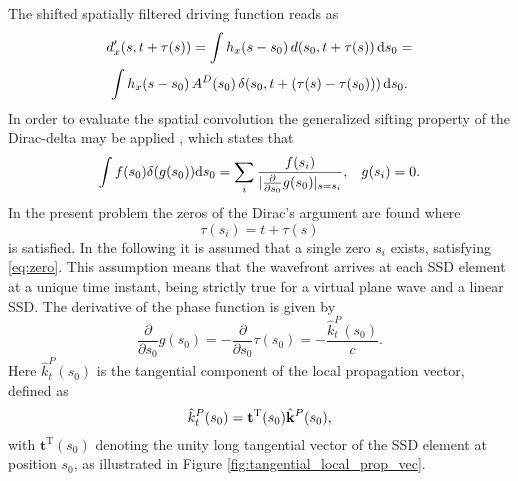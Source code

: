 \documentclass[conference]{IEEEtran}
\begin{document}
The shifted spatially filtered driving function reads as
\begin{multline}
    d'_x(s,t+ \tau(s) ) = \int h_x(s-s_0) \, d(s_0,t+ \tau(s) ) \, \td s_0 = \\
    \int h_x(s-s_0) \, A^D(s_0)\, \delta(s_0,t+ \left(\tau(s)-\tau(s_0)\right)  ) \, \td s_0.
    \label{eq:spat_conv2}
\end{multline}
In order to evaluate the spatial convolution the generalized sifting property of the Dirac-delta may be applied \cite{Firtha2019phd, Jackson1999}, which states that
\begin{equation}
    \int f(s_0) \delta(g(s_0)) \mathrm{d} s_0 = \sum_i \frac{f(s_i)}{| \frac{\partial}{\partial s_0} g(s_0) |_{s = s_i}}, \hspace{3mm} g(s_i) = 0.
\end{equation}
In the present problem the zeros of the Dirac's argument are found where
\begin{equation}
    \tau(s_i) = t + \tau(s)
    \label{eq:zero}
\end{equation}
is satisfied.
In the following it is assumed that a single zero $s_i$ exists, satisfying \eqref{eq:zero}.
This assumption means that the wavefront arrives at each SSD element at a unique time instant, being strictly true for a virtual plane wave and a linear SSD.
The derivative of the phase function is given by
\begin{equation}
    \frac{\partial}{\partial s_0} g(s_0) = - \frac{\partial}{\partial s_0} \tau(s_0) = -\frac{\hat{k}_t^P(s_0)}{c}.
\end{equation}
Here $\hat{k}_t^P(s_0)$ is the tangential component of the local propagation vector, defined as
\begin{equation}
    \hat{k}_t^P(s_0) = \mathbf{t}^{\mathrm{T}}(s_0) \hat{\mathbf{k}}^P(s_0),
\end{equation}
with $\mathbf{t}^{\mathrm{T}}(s_0)$ denoting the unity long tangential vector of the SSD element at position $s_0$, as illustrated in Figure \ref{fig:tangential_local_prop_vec}.
\end{document}
